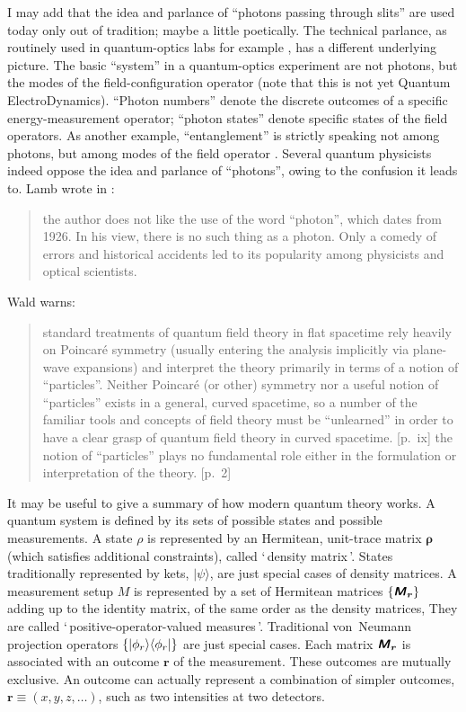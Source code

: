 \documentclass[\ifafour a4paper,12pt,\else a5paper,10pt,\fi%
onecolumn,oneside,article,%
british%
]{memoir}
\newcommand*{\defquote}[1]{`\,#1\,'}
\theoremstyle{remark}
\theoremstyle{innote}
\newcommand*{\mathte}[1]{\textbf{\textit{\textsf{#1}}}}
\newcommand*{\citey}{\parencites*}
\DeclarePairedDelimiter\set{\{}{\}}
\renewcommand*{\|}[1][]{\nonscript\,#1\vert\nonscript\;\mathopen{}}
\newcommand*{\yr}{\bm{\rho}}
\newcommand*{\yM}{\mathte{M}}
\begin{document}
I may add that the idea and parlance of \enquote{photons passing through
  slits} are used today only out of tradition; maybe a little poetically.
The technical parlance, as routinely used in quantum-optics labs for
example \parencite{leonhardt1997,bachoretal1998_r2004}, has a different
underlying picture. The basic \enquote{system} in a quantum-optics
experiment are not photons, but the modes of the field-configuration
operator (note that this is not yet Quantum ElectroDynamics).
\enquote{Photon numbers} denote the discrete outcomes of a specific
energy-measurement operator; \enquote{photon states} denote specific states
of the field operators. As another example, \enquote{entanglement} is
strictly speaking not among photons, but among modes of the field operator
\parencite{vanenk2003b}. Several quantum physicists indeed oppose the idea
and parlance of \enquote{photons}, owing to the confusion it leads to. Lamb
\parencite[of the Lamb shift,][]{lambetal1947} wrote in \cite*{lamb1995}:
\begin{quote}
  \footnotesize the author does not like the use of the word ``photon'',
  which dates from 1926. In his view, there is no such thing as a photon.
  Only a comedy of errors and historical accidents led to its popularity
  among physicists and optical scientists.
\end{quote}
Wald \citey{wald1994} warns:
\begin{quote}
  \footnotesize standard treatments of quantum field theory in flat
  spacetime rely heavily on Poincar\'e symmetry (usually entering the
  analysis implicitly via plane-wave expansions) and interpret the theory
  primarily in terms of a notion of ``particles''. Neither Poincar\'e (or
  other) symmetry nor a useful notion of ``particles'' exists in a general,
  curved spacetime, so a number of the familiar tools and concepts of field
  theory must be ``unlearned'' in order to have a clear grasp of quantum
  field theory in curved spacetime. [p.~ix] \textelp{} the notion of
  ``particles'' plays no fundamental role either in the formulation or
  interpretation of the theory. [p.~2]
\end{quote}

\medskip

It may be useful to give a summary of how modern quantum theory works. A
quantum system is defined by its sets of possible states and possible
measurements. A state $\rho$ is represented by an Hermitean, unit-trace
matrix $\yr$ (which satisfies additional constraints), called
\defquote{density matrix}. States traditionally represented by kets,
$\lvert \psi \rangle$, are just special cases of density matrices. A
measurement setup $M$ is represented by a set of Hermitean matrices
$\set{\yM_{\bm{r}}}$ adding up to the identity matrix, of the same order as
the density matrices, They are called \defquote{positive-operator-valued
  measures}. Traditional von~Neumann projection operators
$\set{\lvert \phi_{r} \rangle\langle \phi_{r}\rvert}$ are just special
cases. Each matrix $\yM_{\bm{r}}$ is associated with an outcome $\bm{r}$ of
the measurement. These outcomes are mutually exclusive. An outcome can
actually represent a combination of simpler outcomes,
$\bm{r}\equiv(x,y,z,\dotsc)$, such as two intensities at two detectors.
\end{document}
